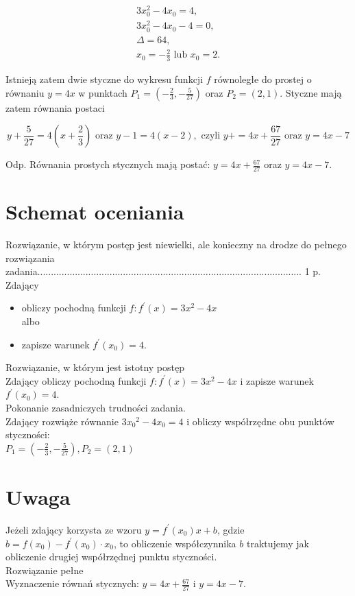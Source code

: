 \documentclass[10pt]{article}
\begin{document}
$$
\begin{gathered}
3 x_{0}^{2}-4 x_{0}=4, \\
3 x_{0}^{2}-4 x_{0}-4=0, \\
\Delta=64, \\
x_{0}=-\frac{2}{3} \text { lub } x_{0}=2 .
\end{gathered}
$$

Istnieją zatem dwie styczne do wykresu funkcji $f$ równoległe do prostej o równaniu $y=4 x$ w punktach $P_{1}=\left(-\frac{2}{3},-\frac{5}{27}\right)$ oraz $P_{2}=(2,1)$. Styczne mają zatem równania postaci

$$
y+\frac{5}{27}=4\left(x+\frac{2}{3}\right) \text { oraz } y-1=4(x-2), \text { czyli } y+=4 x+\frac{67}{27} \text { oraz } y=4 x-7
$$

Odp. Równania prostych stycznych mają postać: $y=4 x+\frac{67}{27}$ oraz $y=4 x-7$.

\section*{Schemat oceniania}
Rozwiązanie, w którym postęp jest niewielki, ale konieczny na drodze do pełnego\\
rozwiązania zadania................................................................................................... 1 p.\\
Zdający

\begin{itemize}
  \item obliczy pochodną funkcji $f: f^{\prime}(x)=3 x^{2}-4 x$\\
albo
  \item zapisze warunek $f^{\prime}\left(x_{0}\right)=4$.
\end{itemize}

Rozwiązanie, w którym jest istotny postęp\\
Zdający obliczy pochodną funkcji $f: f^{\prime}(x)=3 x^{2}-4 x$ i zapisze warunek $f^{\prime}\left(x_{0}\right)=4$.\\
Pokonanie zasadniczych trudności zadania.\\
Zdający rozwiąże równanie $3 x_{0}{ }^{2}-4 x_{0}=4$ i obliczy współrzędne obu punktów styczności:\\
$P_{1}=\left(-\frac{2}{3},-\frac{5}{27}\right), P_{2}=(2,1)$

\section*{Uwaga}
Jeżeli zdający korzysta ze wzoru $y=f^{\prime}\left(x_{0}\right) x+b$, gdzie $b=f\left(x_{0}\right)-f^{\prime}\left(x_{0}\right) \cdot x_{0}$, to obliczenie współczynnika $b$ traktujemy jak obliczenie drugiej współrzędnej punktu styczności.\\
Rozwiązanie pełne\\
Wyznaczenie równań stycznych: $y=4 x+\frac{67}{27}$ i $y=4 x-7$.
\end{document}
